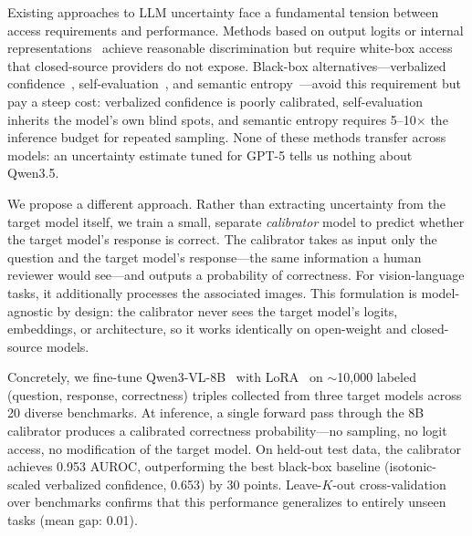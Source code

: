\documentclass{colm2026}
\begin{document}
Existing approaches to LLM uncertainty face a fundamental tension between access requirements and performance. Methods based on output logits or internal representations~\citep{hendrycks2017baseline,kadavath2022language} achieve reasonable discrimination but require white-box access that closed-source providers do not expose. Black-box alternatives---verbalized confidence~\citep{tian2023just}, self-evaluation~\citep{kadavath2022language}, and semantic entropy~\citep{kuhn2023semantic}---avoid this requirement but pay a steep cost: verbalized confidence is poorly calibrated, self-evaluation inherits the model's own blind spots, and semantic entropy requires 5--10$\times$ the inference budget for repeated sampling. None of these methods transfer across models: an uncertainty estimate tuned for GPT-5 tells us nothing about Qwen3.5.

We propose a different approach. Rather than extracting uncertainty from the target model itself, we train a small, separate \emph{calibrator} model to predict whether the target model's response is correct. The calibrator takes as input only the question and the target model's response---the same information a human reviewer would see---and outputs a probability of correctness. For vision-language tasks, it additionally processes the associated images. This formulation is model-agnostic by design: the calibrator never sees the target model's logits, embeddings, or architecture, so it works identically on open-weight and closed-source models.

Concretely, we fine-tune Qwen3-VL-8B~\citep{qwen3vl} with LoRA~\citep{hu2022lora} on ${\sim}$10,000 labeled (question, response, correctness) triples collected from three target models across 20 diverse benchmarks. At inference, a single forward pass through the 8B calibrator produces a calibrated correctness probability---no sampling, no logit access, no modification of the target model. On held-out test data, the calibrator achieves 0.953 AUROC, outperforming the best black-box baseline (isotonic-scaled verbalized confidence, 0.653) by 30 points. Leave-$K$-out cross-validation over benchmarks confirms that this performance generalizes to entirely unseen tasks (mean gap: 0.01).
\end{document}
